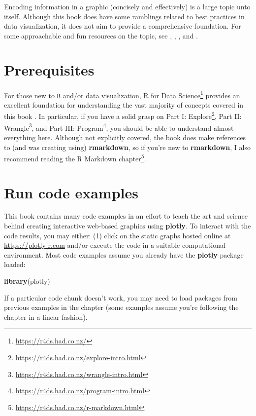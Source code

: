 \documentclass[
  12pt,
]{krantz}
\newenvironment{Shaded}{\begin{snugshade}}{\end{snugshade}}
\newcommand{\KeywordTok}[1]{\textcolor[rgb]{0.13,0.29,0.53}{\textbf{#1}}}
\newcommand{\NormalTok}[1]{#1}
\renewcommand{\href}[2]{#2\footnote{\url{#1}}}
\begin{document}
Encoding information in a graphic (concisely and effectively) is a large topic unto itself. Although this book does have some ramblings related to best practices in data visualization, it does not aim to provide a comprehensive foundation. For some approachable and fun resources on the topic, see \citet{tufte-dataviz}, \citet{yau-dataviz}, \citet{healey-dataviz}, and \citet{claus-dataviz}.

\hypertarget{prerequisites}{%
\section{Prerequisites}\label{prerequisites}}

For those new to \texttt{R} and/or data visualization, \href{https://r4ds.had.co.nz/}{R for Data Science} provides an excellent foundation for understanding the vast majority of concepts covered in this book \citep{r4ds}. In particular, if you have a solid grasp on \href{https://r4ds.had.co.nz/explore-intro.html}{Part I: Explore}, \href{https://r4ds.had.co.nz/wrangle-intro.html}{Part II: Wrangle}, and \href{https://r4ds.had.co.nz/program-intro.html}{Part III: Program}, you should be able to understand almost everything here. Although not explicitly covered, the book does make references to (and was creating using) \textbf{rmarkdown}, so if you're new to \textbf{rmarkdown}, I also recommend reading the \href{https://r4ds.had.co.nz/r-markdown.html}{R Markdown chapter}.

\hypertarget{run-code-examples}{%
\section{Run code examples}\label{run-code-examples}}

This book contains many code examples in an effort to teach the art and science behind creating interactive web-based graphics using \textbf{plotly}. To interact with the code results, you may either: (1) click on the static graphs hosted online at \url{https://plotly-r.com} and/or execute the code in a suitable computational environment. Most code examples assume you already have the \textbf{plotly} package loaded:

\begin{Shaded}
\begin{Highlighting}[]
\KeywordTok{library}\NormalTok{(plotly)}
\end{Highlighting}
\end{Shaded}

If a particular code chunk doesn't work, you may need to load packages from previous examples in the chapter (some examples assume you're following the chapter in a linear fashion).
\end{document}
